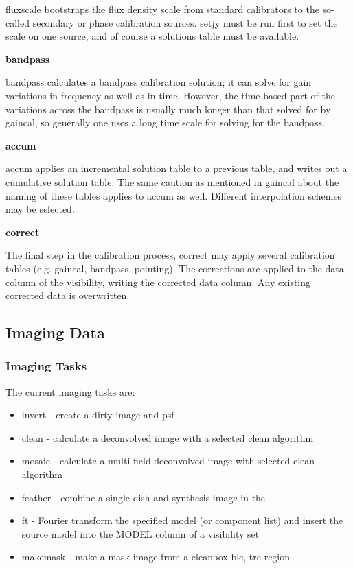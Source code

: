 fluxscale bootstraps the flux density scale from standard calibrators
to the so-called secondary or phase calibration sources. setjy must be
run first to set the scale on one source, and of course a solutions
table must be available. 

\vspace{3mm}
\noindent
{\bf bandpass}

bandpass calculates a bandpass calibration solution; it can solve for
gain variations in frequency as well as in time. However, the
time-based part of the variations across the bandpass is usually much
longer than that solved for by gaincal, so generally one uses a long
time scale for solving for the bandpass. 

\vspace{3mm}
\noindent
{\bf accum}

accum applies an incremental solution table to a previous table, and
writes out a cumulative solution table. The same caution as mentioned
in gaincal about the naming of these tables applies to accum as
well. Different interpolation schemes may be selected. 

\vspace{3mm}
\noindent
{\bf correct}

The final step in the calibration process, correct may apply several
calibration tables (e.g. gaincal, bandpass, pointing). The corrections
are applied to the data column of the visibility, writing the
corrected data column. Any existing corrected data is overwritten. 
 
\subsection{Imaging Data}
\label{subsection:image.data}

\subsubsection{Imaging Tasks}
\label{subsubsection:image.tasks}

The current imaging tasks are:

\begin{itemize}
   \item invert - create a dirty image and psf
   \item clean - calculate a deconvolved image with a selected clean
     algorithm 
   \item mosaic - calculate a multi-field deconvolved image with
     selected clean algorithm 
   \item feather - combine a single dish and synthesis image in the
   \item ft - Fourier transform the specified model (or component
     list) and insert the source model into the MODEL column of a
     visibility set 
   \item makemask - make a mask image from a cleanbox blc, trc region 
\end{itemize}


